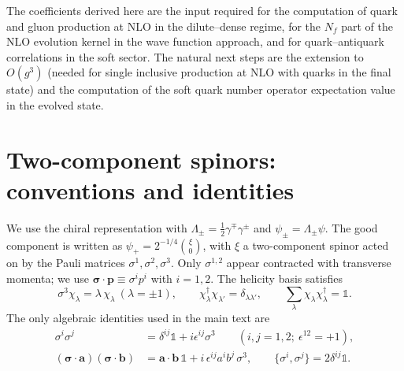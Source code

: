 \documentclass[11pt]{article}
\newcommand{\dg}{\dagger}
\begin{document}
The coefficients derived here are the input required for the computation of quark and gluon
production at NLO in the dilute--dense regime, for the $N_f$ part of the NLO evolution kernel in
the wave function approach, and for quark--antiquark correlations in the soft sector. The
natural next steps are the extension to $O(g^3)$ (needed for single inclusive production at NLO
with quarks in the final state) and the computation of the soft quark number operator expectation
value in the evolved state.

\appendix

\section{Two-component spinors: conventions and identities}
\label{app:spinors}

We use the chiral representation with $\Lambda_\pm=\tfrac12\gamma^\mp\gamma^\pm$ and
$\psi_\pm=\Lambda_\pm\psi$. The good component is written as
$\psi_+=2^{-1/4}\binom{\xi}{0}$, with $\xi$ a two-component spinor acted on by the Pauli matrices
$\sigma^1,\sigma^2,\sigma^3$. Only $\sigma^{1,2}$ appear contracted with transverse momenta; we use
$\bm\sigma\!\cdot\!\bm p\equiv\sigma^ip^i$ with $i=1,2$. The helicity basis satisfies
\begin{equation}
\sigma^3\chi_\lambda=\lambda\,\chi_\lambda\ (\lambda=\pm1),\qquad
\chi^\dg_\lambda\chi_{\lambda'}=\delta_{\lambda\lambda'},\qquad
\sum_{\lambda}\chi_\lambda\chi^\dg_\lambda=\mathbb 1 .
\end{equation}
The only algebraic identities used in the main text are
\begin{align}
\sigma^i\sigma^j&=\delta^{ij}\mathbb 1+i\epsilon^{ij}\sigma^3\qquad (i,j=1,2;\ \epsilon^{12}=+1),
\label{eq:sigalg}\\
(\bm\sigma\!\cdot\!\bm a)(\bm\sigma\!\cdot\!\bm b)&=\bm a\!\cdot\!\bm b\,\mathbb 1
+i\,\epsilon^{ij}a^ib^j\,\sigma^3,
\qquad
\{\sigma^i,\sigma^j\}=2\delta^{ij}\mathbb 1 .
\end{align}
\end{document}
